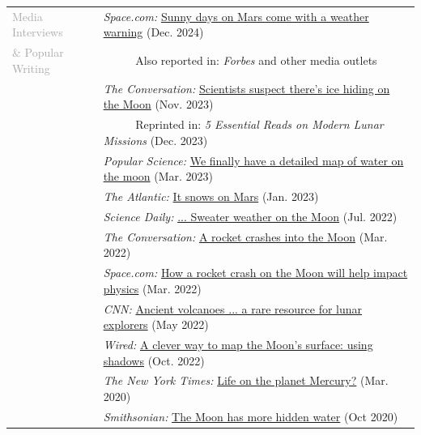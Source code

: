 \documentclass[letterpaper,10pt,twoside]{article}
\begin{document}
\begin{tabular}{@{} l l}
\large{\textcolor{darkgray}{Media Interviews}} & \textit{Space.com:} \href{https://www.space.com/the-universe/mars/sunny-days-on-mars-come-with-a-weather-warning-dust-storms-ahead}{Sunny days on Mars come with a weather warning} (Dec. 2024)\\
\large{\textcolor{darkgray}{\& Popular Writing}} &~~~~~ Also reported in: \textit{Forbes} and other media outlets\\
 & \textit{The Conversation:} \href{https://theconversation.com/scientists-suspect-theres-ice-hiding-on-the-moon-and-a-host-of-missions-from-the-us-and-beyond-are-searching-for-it-216060}{Scientists suspect there's ice hiding on the Moon} (Nov. 2023)\\
 &~~~~~ Reprinted in: \textit{5 Essential Reads on Modern Lunar Missions} (Dec. 2023)\\
 & \textit{Popular Science:} \href{https://www.popsci.com/science/water-moon-first-map/}{We finally have a detailed map of water on the moon} (Mar. 2023)\\
& \textit{The Atlantic:} \href{https://www.theatlantic.com/science/archive/2023/01/mars-snow-evidence/672793/}{It snows on Mars} (Jan. 2023) \\
 & \textit{Science Daily:} \href{https://www.sciencedaily.com/releases/2022/07/220726160213.htm}{... Sweater weather on the Moon} (Jul. 2022)\\
 & \textit{The Conversation:} \href{https://theconversation.com/a-rocket-crashes-into-the-moon-the-accidental-experiment-will-shed-light-on-the-physics-of-impacts-in-space-177977}{A rocket crashes into the Moon} (Mar. 2022)\\
 & \textit{Space.com:} \href{https://www.space.com/rocket-moon-crash-space-impact-physics-march-2022}{How a rocket crash on the Moon will help impact physics} (Mar. 2022)\\
 & \textit{CNN:} \href{https://www.cnn.com/2022/05/27/world/ancient-moon-volcanoes-water-scn/index.html}{Ancient volcanoes ... a rare resource for lunar explorers} (May 2022)\\
 & \textit{Wired:} \href{https://www.wired.co.uk/article/mapping-moon-shadows}{A clever way to map the Moon's surface: using shadows} (Oct. 2022)\\
 & \textit{The New York Times:} \href{https://www.nytimes.com/2020/03/24/science/mercury-life-water.html}{Life on the planet Mercury?} (Mar. 2020)\\
 & \textit{Smithsonian:} \href{https://www.smithsonianmag.com/smart-news/moon-has-more-water-and-ice-hidden-its-surface-originally-predicted-180976146/}{The Moon has more hidden water} (Oct 2020)\\

\end{tabular}
\end{document}
